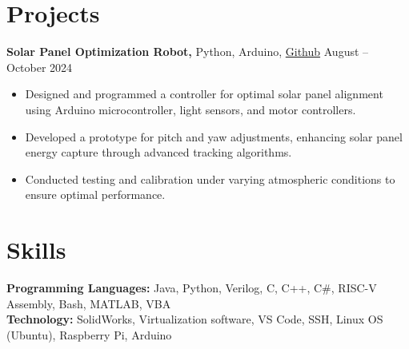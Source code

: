 \documentclass[11pt]{article}       %
\begin{document}
\vspace{-19pt}
\section*{Projects}

\textbf{Solar Panel Optimization Robot, }{Python, Arduino, \href{https://github.com/easilva04/SolarPanelProject}{Github}} \hfill{August -- October 2024} \\
\vspace{-6.5pt}
\begin{itemize}
  \item Designed and programmed a controller for optimal solar panel alignment using Arduino microcontroller, light sensors, and motor controllers.
  \item Developed a prototype for pitch and yaw adjustments, enhancing solar panel energy capture through advanced tracking algorithms.
  \item Conducted testing and calibration under varying atmospheric conditions to ensure optimal performance.
\end{itemize}


\section*{Skills}
\textbf{Programming Languages:} Java, Python, Verilog, C, C++, C\#, RISC-V Assembly, Bash, MATLAB, VBA \\
\textbf{Technology:} SolidWorks, Virtualization software, VS Code, SSH, Linux OS (Ubuntu), Raspberry Pi, Arduino \\
\end{document}
